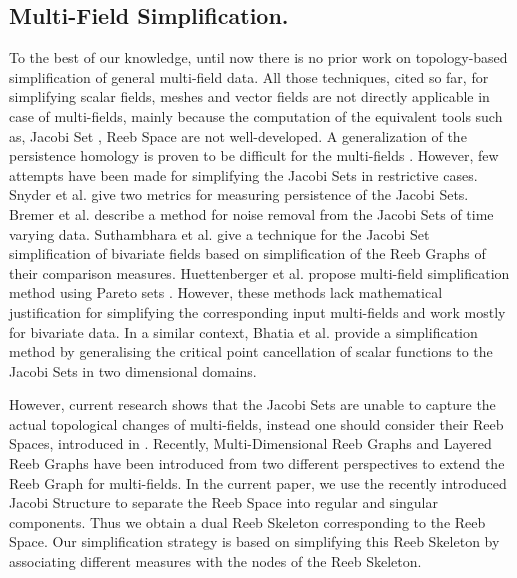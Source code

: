 \documentclass[twocolumn]{article}
\begin{document}
\subsection*{Multi-Field Simplification.} 
To the best of our knowledge, until now there is no prior work
 on topology-based simplification of general multi-field data. 
All those techniques, cited so far, for simplifying scalar fields,
meshes and vector fields are not directly applicable in case of
multi-fields, mainly because the computation of the equivalent tools
such as, Jacobi Set \cite{2004-edels-localglobal}, Reeb Space \cite{2008-edels-reebspace} are
not well-developed.
A generalization of the persistence homology is proven to be difficult
for the multi-fields \cite{2007-carlsson-persist-multi}. 
However, few attempts have been made for
simplifying the Jacobi Sets in restrictive cases. 
Snyder et al. \cite{2004-snyder} give two metrics for
measuring persistence of the  Jacobi Sets.  Bremer et al. \cite{2007-Bremer} describe a
method for noise removal from the Jacobi Sets of time varying data.
Suthambhara et al. \cite{2009-Nataraj-Jacobi} give a technique for the
Jacobi Set simplification of bivariate fields based on simplification
of the Reeb Graphs of their comparison measures. 
Huettenberger et al. propose multi-field
simplification method using Pareto sets \cite{2013-Huettenberger-pareto,
  2014-Huettenberger-tvcg}. However, these methods lack 
mathematical justification for simplifying the corresponding input multi-fields and
work mostly for bivariate data.
In a similar context, Bhatia et al. \cite{2013-Bhatia} provide a simplification
method by generalising the critical point cancellation of scalar
functions to the  Jacobi Sets in two dimensional domains.

However, current research shows that the Jacobi Sets are unable to capture
the actual topological changes of multi-fields,
instead one should consider their Reeb Spaces,
introduced in \cite{2008-edels-reebspace}.
Recently, Multi-Dimensional Reeb Graphs \cite{2014-EuroVis-short} and
Layered Reeb Graphs \cite{2014-Strodthoff} have been introduced from
two different perspectives to extend the Reeb Graph for multi-fields. 
In the current paper, we use the recently introduced Jacobi
Structure \cite{2014-EuroVis-short} to separate the Reeb Space into regular and singular components.
Thus we obtain a dual Reeb Skeleton corresponding to the Reeb Space.
Our simplification strategy is based on simplifying this Reeb Skeleton
 by associating different measures with the nodes of the
Reeb Skeleton.
%
\end{document}
